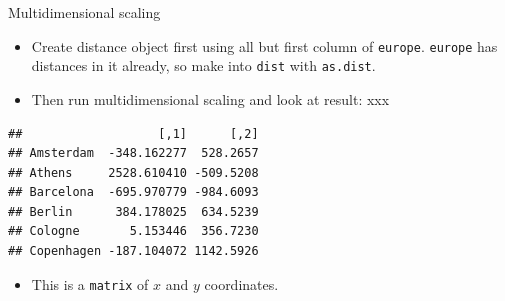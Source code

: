 \documentclass[ignorenonframetext,]{beamer}
\newenvironment{Shaded}{\begin{snugshade}}{\end{snugshade}}
\newcommand{\KeywordTok}[1]{\textcolor[rgb]{0.13,0.29,0.53}{\textbf{#1}}}
\newcommand{\NormalTok}[1]{#1}
\newcommand{\OperatorTok}[1]{\textcolor[rgb]{0.81,0.36,0.00}{\textbf{#1}}}
\newcommand{\StringTok}[1]{\textcolor[rgb]{0.31,0.60,0.02}{#1}}
\providecommand{\tightlist}{%
  \setlength{\itemsep}{0pt}\setlength{\parskip}{0pt}}
\begin{document}
\begin{frame}[fragile]{Multidimensional scaling}
\protect\hypertarget{multidimensional-scaling-2}{}

\begin{itemize}
\item
  Create distance object first using all but first column of
  \texttt{europe}. \texttt{europe} has distances in it already, so make
  into \texttt{dist} with \texttt{as.dist}.
\item
  Then run multidimensional scaling and look at result: xxx
\end{itemize}

\begin{Shaded}
\end{Shaded}

\begin{verbatim}
##                   [,1]      [,2]
## Amsterdam  -348.162277  528.2657
## Athens     2528.610410 -509.5208
## Barcelona  -695.970779 -984.6093
## Berlin      384.178025  634.5239
## Cologne       5.153446  356.7230
## Copenhagen -187.104072 1142.5926
\end{verbatim}

\begin{itemize}
\tightlist
\item
  This is a \texttt{matrix} of \(x\) and \(y\) coordinates.
\end{itemize}

\end{frame}
\end{document}
